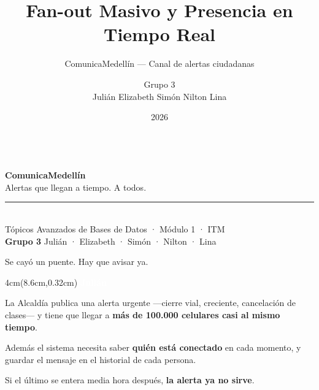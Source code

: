 \documentclass[aspectratio=169,11pt]{beamer}
\title{\textbf{Fan-out Masivo y Presencia en Tiempo Real}}
\subtitle{ComunicaMedellín — Canal de alertas ciudadanas}
\author{Grupo 3 \\[4pt]
  \small Julián \quad Elizabeth \quad Simón \quad Nilton \quad Lina}
\institute{Tópicos Avanzados de Bases de Datos · Módulo 1 · ITM}
\date{2026}
\newcommand{\quien}[1]{%
  \begin{textblock*}{4cm}(8.6cm,0.32cm)
    \tiny\textcolor{white}{\textbf{#1}}
  \end{textblock*}}
\begin{document}
\begin{frame}[plain]
\vfill
\centering
{\logomarca[3.2]}\\[14pt]
{\Huge\textcolor{cmAzul}{\textbf{Comunica}}\textcolor{cmVerde}{\textbf{Medellín}}}\\[8pt]
{\large\textcolor{cmGris}{Alertas que llegan a tiempo. A todos.}}\\[20pt]
\rule{0.35\textwidth}{0.4pt}\\[12pt]
{\footnotesize\textcolor{cmGris}{Tópicos Avanzados de Bases de Datos · Módulo 1 · ITM}}\\[6pt]
{\footnotesize\textbf{Grupo 3} \quad
 \textcolor{cmGris}{Julián · Elizabeth · Simón · Nilton · Lina}}
\vfill
\end{frame}

\begin{frame}{Se cayó un puente. Hay que avisar ya.}
\quien{Julián}
\centering
\vspace{4pt}

\vspace{10pt}
\begin{minipage}{0.86\textwidth}\small
La Alcaldía publica una alerta urgente —cierre vial, creciente, cancelación de
clases— y tiene que llegar a \textbf{más de 100.000 celulares casi al mismo
tiempo}.

\vspace{6pt}
Además el sistema necesita saber \textbf{quién está conectado} en cada momento,
y guardar el mensaje en el historial de cada persona.
\end{minipage}

\vspace{10pt}
\begin{block}{\small}
\centering\footnotesize
Si el último se entera media hora después, \textbf{la alerta ya no sirve}.
\end{block}
\end{frame}
\end{document}
